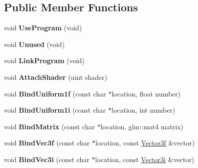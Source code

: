 \subsection*{Public Member Functions}
\begin{DoxyCompactItemize}
\item 
\hypertarget{classEngine_1_1ShaderARB_a06f2725524cdf78189b30bc88459d1aa}{}void {\bfseries Use\+Program} (void)\label{classEngine_1_1ShaderARB_a06f2725524cdf78189b30bc88459d1aa}

\item 
\hypertarget{classEngine_1_1ShaderARB_a153d4e3d6499f118074c3ab48b3a91aa}{}void {\bfseries Unused} (void)\label{classEngine_1_1ShaderARB_a153d4e3d6499f118074c3ab48b3a91aa}

\item 
\hypertarget{classEngine_1_1ShaderARB_a76d4c923f44e56f052cd956eaadea4a0}{}void {\bfseries Link\+Program} (void)\label{classEngine_1_1ShaderARB_a76d4c923f44e56f052cd956eaadea4a0}

\item 
\hypertarget{classEngine_1_1ShaderARB_a162938b504280bf2073038b968ce142b}{}void {\bfseries Attach\+Shader} (uint shader)\label{classEngine_1_1ShaderARB_a162938b504280bf2073038b968ce142b}

\item 
\hypertarget{classEngine_1_1ShaderARB_afbd7960f5a877c6ae1fc6a201b593398}{}void {\bfseries Bind\+Uniform1f} (const char $\ast$location, float number)\label{classEngine_1_1ShaderARB_afbd7960f5a877c6ae1fc6a201b593398}

\item 
\hypertarget{classEngine_1_1ShaderARB_ab1b96ff776f8f049e0afe379e7c39ad6}{}void {\bfseries Bind\+Uniform1i} (const char $\ast$location, int number)\label{classEngine_1_1ShaderARB_ab1b96ff776f8f049e0afe379e7c39ad6}

\item 
\hypertarget{classEngine_1_1ShaderARB_a50d15a0d31d9d96c0364f69a3f033663}{}void {\bfseries Bind\+Matrix} (const char $\ast$location, glm\+::mat4 matrix)\label{classEngine_1_1ShaderARB_a50d15a0d31d9d96c0364f69a3f033663}

\item 
\hypertarget{classEngine_1_1ShaderARB_a51a4324f4f680038ec6edade070e65b0}{}void {\bfseries Bind\+Vec3f} (const char $\ast$location, const \hyperlink{classVector3}{Vector3f} \&vector)\label{classEngine_1_1ShaderARB_a51a4324f4f680038ec6edade070e65b0}

\item 
\hypertarget{classEngine_1_1ShaderARB_adf8f26bbc4817853fb5722b197679aaf}{}void {\bfseries Bind\+Vec3i} (const char $\ast$location, const \hyperlink{classVector3}{Vector3i} \&vector)\label{classEngine_1_1ShaderARB_adf8f26bbc4817853fb5722b197679aaf}


\end{DoxyCompactItemize}
